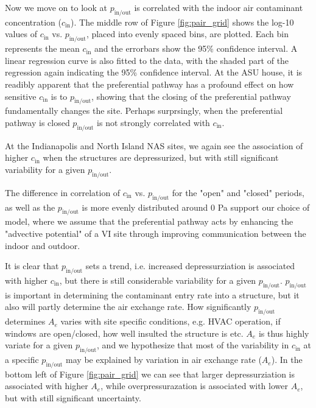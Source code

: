 \documentclass[journal=esthag,manuscript=article]{achemso}
\begin{document}
Now we move on to look at $p_\mathrm{in/out}$ is correlated with the indoor air contaminant concentration ($c_\mathrm{in}$).
The middle row of Figure \ref{fig:pair_grid} shows the log-10 values of $c_\mathrm{in}$ vs. $p_\mathrm{in/out}$, placed into evenly spaced bins, are plotted.
Each bin represents the mean $c_\mathrm{in}$ and the errorbars show the 95\% confidence interval. %
A linear regression curve is also fitted to the data, with the shaded part of the regression again indicating the 95\% confidence interval. %
At the ASU house, it is readibly apparent that the preferential pathway has a profound effect on how sensitive $c_\mathrm{in}$ is to $p_\mathrm{in/out}$, showing that the closing of the preferential pathway fundamentally changes the site.
Perhaps surprsingly, when the preferential pathway is closed $p_\mathrm{in/out}$ is not strongly correlated with $c_\mathrm{in}$.

At the Indianapolis and North Island NAS sites, we again see the association of higher $c_\mathrm{in}$ when the structures are depressurized, but with still significant variability for a given $p_\mathrm{in/out}$.

The difference in correlation of $c_\mathrm{in}$ vs. $p_\mathrm{in/out}$ for the "open" and "closed" periods, as well as the $p_\mathrm{in/out}$ is more evenly distributed around 0 Pa support our choice of model, where we assume that the preferential pathway acts by enhancing the "advective potential" of a VI site through improving communication between the indoor and outdoor.

It is clear that $p_\mathrm{in/out}$ sets a trend, i.e. increased depressurziation is associated with higher $c_\mathrm{in}$, but there is still considerable variability for a given $p_\mathrm{in/out}$.
$p_\mathrm{in/out}$ is important in determining the contaminant entry rate into a structure, but it also will partly determine the air exchange rate.
How significantly $p_\mathrm{in/out}$ determines $A_e$ varies with site specific conditions, e.g. HVAC operation, if windows are open/closed, how well insulted the structure is etc.
$A_e$ is thus highly variate for a given $p_\mathrm{in/out}$, and we hypothesize that most of the variability in $c_\mathrm{in}$ at a specific $p_\mathrm{in/out}$ may be explained by variation in air exchange rate ($A_e$).
In the bottom left of Figure \ref{fig:pair_grid} we can see that larger depressurziation is associated with higher $A_e$, while overpressurazation is associated with lower $A_e$, but with still significant uncertainty.
\end{document}
